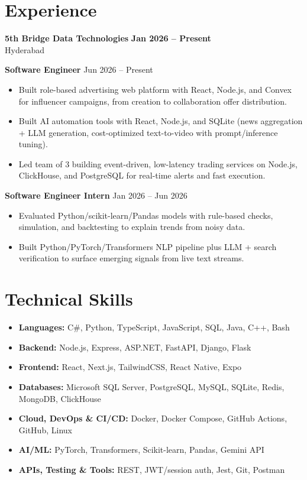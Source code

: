 \documentclass[a4paper,11pt]{article}
\newcommand{\resumeItem}[1]{\item \small{#1}}
\newcommand{\resumeSubheading}[4]{%
  \textbf{#1} \hfill \textbf{#2} \\
{#3} \hfill {#4}
}
\newcommand{\resumeSubHeadingListStart}{\begin{itemize}}
\newcommand{\resumeSubHeadingListEnd}{\end{itemize}}
\begin{document}
\section*{Experience}

\resumeSubheading
{5th Bridge Data Technologies}{Jan 2026 -- Present}
{Hyderabad}{}

\textbf{Software Engineer} \hfill {Jun 2026 -- Present}
\resumeSubHeadingListStart
\resumeItem{Built role-based advertising web platform with React, Node.js, and Convex for influencer campaigns, from creation to collaboration offer distribution.}
\resumeItem{Built AI automation tools with React, Node.js, and SQLite (news aggregation + LLM generation, cost-optimized text-to-video with prompt/inference tuning).}
\resumeItem{Led team of 3 building event-driven, low-latency trading services on Node.js, ClickHouse, and PostgreSQL for real-time alerts and fast execution.}
\resumeSubHeadingListEnd

\textbf{Software Engineer Intern} \hfill {Jan 2026 -- Jun 2026}
\resumeSubHeadingListStart
\resumeItem{Evaluated Python/scikit-learn/Pandas models with rule-based checks, simulation, and backtesting to explain trends from noisy data.}
\resumeItem{Built Python/PyTorch/Transformers NLP pipeline plus LLM + search verification to surface emerging signals from live text streams.}
\resumeSubHeadingListEnd


\section*{Technical Skills}
\begin{itemize}
\item \textbf{Languages:} C\#, Python, TypeScript, JavaScript, SQL, Java, C++, Bash
\item \textbf{Backend:} Node.js, Express, ASP.NET, FastAPI, Django, Flask
\item \textbf{Frontend:} React, Next.js, TailwindCSS, React Native, Expo
\item \textbf{Databases:} Microsoft SQL Server, PostgreSQL, MySQL, SQLite, Redis, MongoDB, ClickHouse
\item \textbf{Cloud, DevOps \& CI/CD:} Docker, Docker Compose, GitHub Actions, GitHub, Linux
\item \textbf{AI/ML:} PyTorch, Transformers, Scikit-learn, Pandas, Gemini API
\item \textbf{APIs, Testing \& Tools:} REST, JWT/session auth, Jest, Git, Postman
\end{itemize}
\end{document}
